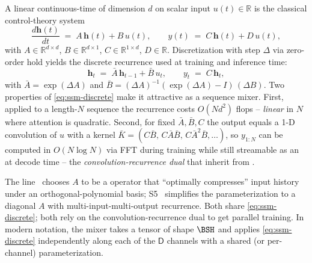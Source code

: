A linear continuous-time  of dimension $d$ on scalar input
$u(t) \in \mathbb{R}$ is the classical control-theory system
\begin{equation}
  \frac{d \boldsymbol{h}(t)}{d t} \;=\; A\,\boldsymbol{h}(t) + B\,u(t),
  \qquad
  y(t) \;=\; C\,\boldsymbol{h}(t) + D\,u(t),
  \label{eq:ssm-continuous}
\end{equation}
with $A \in \mathbb{R}^{d \times d}$, $B \in \mathbb{R}^{d \times 1}$,
$C \in \mathbb{R}^{1 \times d}$, $D \in
\mathbb{R}$. Discretization with step $\Delta$ via
zero-order hold yields the discrete recurrence used at training and
inference time:
\begin{equation}
  \boldsymbol{h}_t \;=\; \bar{A}\,\boldsymbol{h}_{t-1} + \bar{B}\,u_t,
  \qquad
  y_t \;=\; C\,\boldsymbol{h}_t,
  \tag{Mamba--Eq.~2a}
  \label{eq:ssm-discrete}
\end{equation}
with $\bar{A} = \exp(\Delta A)$ and $\bar{B} =
(\Delta A)^{-1}(\exp(\Delta A) - I)\,(\Delta B)$. Two
properties of \eqref{eq:ssm-discrete} make it attractive as a sequence
mixer. First, applied to a length-$N$ sequence the recurrence costs
$O(N d^2)$ flops -- \emph{linear} in $N$ where attention is quadratic.
Second, for fixed $\bar{A}, \bar{B}, C$ the output equals a 1-D
convolution of $u$ with a kernel
$\bar{K} = (C\bar{B},\, C\bar{A}\bar{B},\, C\bar{A}^2\bar{B}, \ldots)$,
so $y_{1:N}$ can be computed in $O(N \log N)$ via FFT during training
while still streamable as an  at decode time -- the
\emph{convolution-recurrence dual} that \citet{gu2023-mamba} inherit
from .

The  line~\citep[no KB entry; ]{}
chooses $A$ to be a  operator that ``optimally compresses'' input
history under an orthogonal-polynomial basis; S5~ simplifies the parameterization to a diagonal
$A$ with multi-input-multi-output recurrence. Both share
\eqref{eq:ssm-discrete}; both rely on the convolution-recurrence dual to
get parallel training. In modern  notation, the  mixer
takes a tensor of shape $\BSH$ and applies \eqref{eq:ssm-discrete}
independently along each of the $\mathsf{D}$  channels with a
shared (or per-channel) parameterization.

